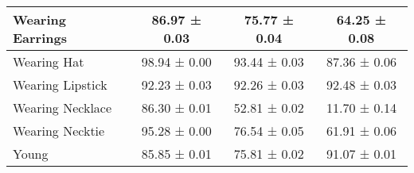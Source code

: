 \begin{table*}[h]
{\begin{tabular}{|l|c|c|c|}
Wearing Earrings   & 86.97 ± 0.03 & 75.77 ± 0.04 & 64.25 ± 0.08 \\ \hline
Wearing Hat        & 98.94 ± 0.00 & 93.44 ± 0.03 & 87.36 ± 0.06 \\ \hline
Wearing Lipstick   & 92.23 ± 0.03 & 92.26 ± 0.03 & 92.48 ± 0.03 \\ \hline
Wearing Necklace   & 86.30 ± 0.01 & 52.81 ± 0.02 & 11.70 ± 0.14 \\ \hline
Wearing Necktie    & 95.28 ± 0.00 & 76.54 ± 0.05 & 61.91 ± 0.06 \\ \hline
Young              & 85.85 ± 0.01 & 75.81 ± 0.02 & 91.07 ± 0.01 \\ \hline
\end{tabular}
}
\vskip -0.1in
\end{table*}


\begin{table*}[h]
\centering
\caption{\small Per-attribute accuracy, balanced accuracy, and F1-score of ImageNet-pretrained ResNet-50 when transferred to multi-label prediction on CelebA, with the $\beta$ of CT optimized globally for the highest mean accuracy across attributes (\textbf{Macro Best}) (\textbf{bold} values indicate cases where the metric remains the same under both Micro Best and Macro Best $\beta$). \textbf{The small performance gap between Micro Best and Macro Best demonstrates the stability of CT on more fine-grained downstream tasks.} Reported values include means and standard deviations over three runs.}
\label{tab:per-attr-celeba-macro-full-resnet50}
\begin{center}
\begin{small}
\end{small}
\end{center}
\end{table*}
